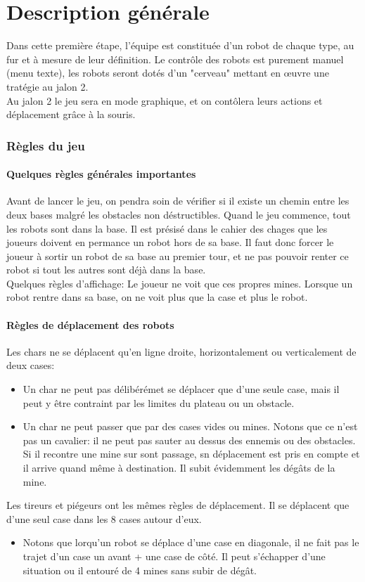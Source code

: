 \documentclass[12pt,a4paper]{article}
\begin{document}
\newpage				
\part{Description générale}
	Dans cette première étape, l'équipe est constituée d'un robot de chaque type, au fur et à mesure de leur définition. Le contrôle des robots est purement manuel (menu texte), les robots seront dotés d'un "cerveau" mettant en œuvre une tratégie au jalon 2. \\
	Au jalon 2 le jeu sera en mode graphique, et on contôlera leurs actions et déplacement grâce à la souris.
	\section{Règles du jeu}
		\subsection{Quelques règles générales importantes}
			Avant de lancer le jeu, on pendra soin de vérifier si il existe un chemin entre les deux bases malgré les obstacles non déstructibles. Quand le jeu commence, tout les robots sont dans la base. Il est présisé dans le cahier des chages que les joueurs doivent en permance un robot hors de sa base. Il faut donc forcer le joueur à sortir un robot de sa base au premier tour, et ne pas pouvoir renter ce robot si tout les autres sont déjà dans la base. \\
			Quelques règles d'affichage: Le joueur ne voit que ces propres mines. Lorsque un robot rentre dans sa base, on ne voit plus que la case et plus le robot.
		\subsection{Règles de déplacement des robots}
			Les chars ne se déplacent qu'en ligne droite, horizontalement ou verticalement de deux cases:
			\begin{itemize}
				\item Un char ne peut pas délibérémet se déplacer que d'une seule case, mais il peut y être contraint par les limites du plateau ou un obstacle.
				\item Un char ne peut passer que par des cases vides ou mines. Notons que ce n'est pas un cavalier: il ne peut pas sauter au dessus des ennemis ou des obstacles. Si il recontre une mine sur sont passage, sn déplacement est pris en compte et il arrive quand même à destination. Il subit évidemment les dégâts de la mine. \\
			\end{itemize}
				Les tireurs et piégeurs ont les mêmes règles de déplacement. Il se déplacent que d'une seul case dans les 8 cases autour d'eux.
			\begin{itemize}
				\item Notons que lorqu'un robot se déplace d'une case en diagonale, il ne fait pas le trajet d'un case un avant + une case de côté. Il peut s'échapper d'une situation ou il entouré de 4 mines sans subir de dégât.
			\end{itemize}
\end{document}
